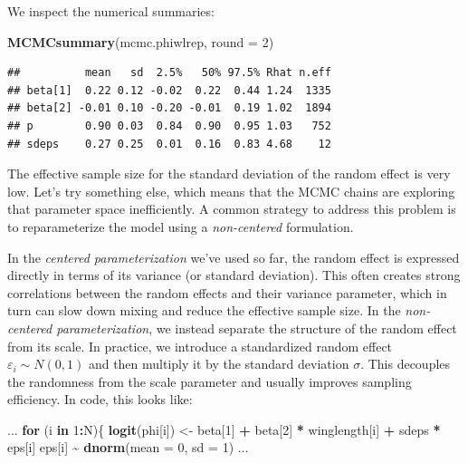 \documentclass[
  12pt,
]{krantz}
\newenvironment{Shaded}{\begin{snugshade}}{\end{snugshade}}
\newcommand{\AttributeTok}[1]{\textcolor[rgb]{0.13,0.29,0.53}{#1}}
\newcommand{\ControlFlowTok}[1]{\textcolor[rgb]{0.13,0.29,0.53}{\textbf{#1}}}
\newcommand{\DecValTok}[1]{\textcolor[rgb]{0.00,0.00,0.81}{#1}}
\newcommand{\FunctionTok}[1]{\textcolor[rgb]{0.13,0.29,0.53}{\textbf{#1}}}
\newcommand{\NormalTok}[1]{#1}
\newcommand{\OtherTok}[1]{\textcolor[rgb]{0.56,0.35,0.01}{#1}}
\newcommand{\SpecialCharTok}[1]{\textcolor[rgb]{0.81,0.36,0.00}{\textbf{#1}}}
\begin{document}
We inspect the numerical summaries:

\begin{Shaded}
\begin{Highlighting}[]
\FunctionTok{MCMCsummary}\NormalTok{(mcmc.phiwlrep, }\AttributeTok{round =} \DecValTok{2}\NormalTok{)}
\end{Highlighting}
\end{Shaded}

\begin{verbatim}
##          mean   sd  2.5%   50% 97.5% Rhat n.eff
## beta[1]  0.22 0.12 -0.02  0.22  0.44 1.24  1335
## beta[2] -0.01 0.10 -0.20 -0.01  0.19 1.02  1894
## p        0.90 0.03  0.84  0.90  0.95 1.03   752
## sdeps    0.27 0.25  0.01  0.16  0.83 4.68    12
\end{verbatim}

The effective sample size for the standard deviation of the random effect is very low. Let's try something else, which means that the MCMC chains are exploring that parameter space inefficiently. A common strategy to address this problem is to reparameterize the model using a \emph{non-centered} formulation.

In the \emph{centered parameterization} we've used so far, the random effect is expressed directly in terms of its variance (or standard deviation). This often creates strong correlations between the random effects and their variance parameter, which in turn can slow down mixing and reduce the effective sample size. In the \emph{non-centered parameterization}, we instead separate the structure of the random effect from its scale. In practice, we introduce a standardized random effect \(\varepsilon_i \sim N(0,1)\) and then multiply it by the standard deviation \(\sigma\). This decouples the randomness from the scale parameter and usually improves sampling efficiency. In code, this looks like:

\begin{Shaded}
\begin{Highlighting}[]
\NormalTok{...}
  \ControlFlowTok{for}\NormalTok{ (i }\ControlFlowTok{in} \DecValTok{1}\SpecialCharTok{:}\NormalTok{N)\{}
    \FunctionTok{logit}\NormalTok{(phi[i]) }\OtherTok{\textless{}{-}}\NormalTok{ beta[}\DecValTok{1}\NormalTok{] }\SpecialCharTok{+}\NormalTok{ beta[}\DecValTok{2}\NormalTok{] }\SpecialCharTok{*}\NormalTok{ winglength[i] }\SpecialCharTok{+}\NormalTok{ sdeps }\SpecialCharTok{*}\NormalTok{ eps[i]}
\NormalTok{    eps[i] }\SpecialCharTok{\textasciitilde{}} \FunctionTok{dnorm}\NormalTok{(}\AttributeTok{mean =} \DecValTok{0}\NormalTok{, }\AttributeTok{sd =} \DecValTok{1}\NormalTok{)}
\NormalTok{...}
\end{Highlighting}
\end{Shaded}
\end{document}
